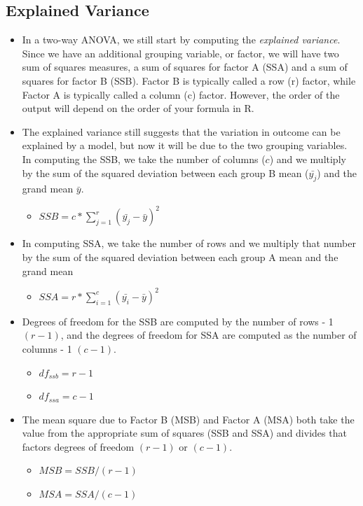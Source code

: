 \documentclass[
  letterpaper,
  DIV=11,
  numbers=noendperiod]{scrreprt}
\providecommand{\tightlist}{%
  \setlength{\itemsep}{0pt}\setlength{\parskip}{0pt}}\usepackage{longtable,booktabs,array}
\begin{document}
\subsection{Explained Variance}\label{explained-variance-1}

\begin{itemize}
\item
  In a two-way ANOVA, we still start by computing the \emph{explained
  variance}. Since we have an additional grouping variable, or factor,
  we will have two sum of squares measures, a sum of squares for factor
  A (SSA) and a sum of squares for factor B (SSB). Factor B is typically
  called a row (r) factor, while Factor A is typically called a column
  (c) factor. However, the order of the output will depend on the order
  of your formula in R.
\item
  The explained variance still suggests that the variation in outcome
  can be explained by a model, but now it will be due to the two
  grouping variables. In computing the SSB, we take the number of
  columns (\(c\)) and we multiply by the sum of the squared deviation
  between each group B mean (\(\bar{y_j}\)) and the grand mean
  \(\bar{y}\).

  \begin{itemize}
  \tightlist
  \item
    \(SSB = c*\sum^r_{j=1}{(\bar{y_j}-\bar{y}) ^2}\)
  \end{itemize}
\item
  In computing SSA, we take the number of rows and we multiply that
  number by the sum of the squared deviation between each group A mean
  and the grand mean

  \begin{itemize}
  \tightlist
  \item
    \(SSA =r*\sum^c_{i=1}{(\bar{y_i}-\bar{y}) ^2}\)
  \end{itemize}
\item
  Degrees of freedom for the SSB are computed by the number of rows - 1
  \((r-1)\), and the degrees of freedom for SSA are computed as the
  number of columns - 1 \((c-1)\).

  \begin{itemize}
  \tightlist
  \item
    \(df_{ssb} = r-1\)
  \item
    \(df_{ssa} = c-1\)
  \end{itemize}
\item
  The mean square due to Factor B (MSB) and Factor A (MSA) both take the
  value from the appropriate sum of squares (SSB and SSA) and divides
  that factors degrees of freedom \((r-1)\) or \((c-1)\).

  \begin{itemize}
  \tightlist
  \item
    \(MSB = SSB/(r-1)\)
  \item
    \(MSA = SSA/(c-1)\)
  \end{itemize}
\end{itemize}
\end{document}
